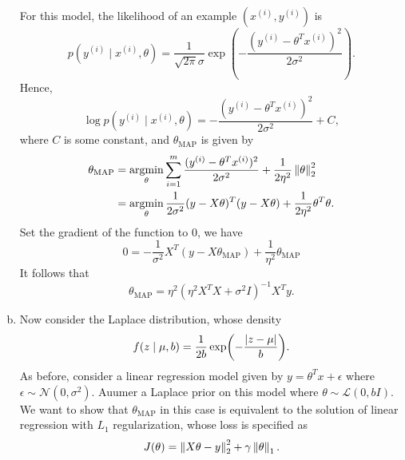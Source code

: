\documentclass[12pt,letterpaper,boxed]{hmcpset}
\newcommand{\yy}{y^{(i)}}
\newcommand{\xx}{x^{(i)}}
\DeclareMathOperator*{\argmin}{argmin}
\newcommand{\thetamap}{\theta_{\mathrm{MAP}}}
\begin{document}
\begin{solution}
\begin{enumerate}[(a)]
    For this model, the likelihood of an example $(\xx, \yy)$ is
    \[
    p(\yy \mid \xx, \theta) = \frac{1}{\sqrt{2\pi} \sigma} \exp(-\frac{(\yy - \theta^T \xx)^2}{2\sigma^2}).
    \]
    Hence,
    \[
    \log p(\yy \mid \xx, \theta) = - \frac{(\yy - \theta^T \xx)^2}{2\sigma^2} + C,
    \]
    where $C$ is some constant, and $\theta_{\mathrm{MAP}}$ is given by
    \[
    \begin{aligned}
      \theta_{\mathrm{MAP}} &= \argmin_\theta \sum_{i=1}^m \frac{(\yy - \theta^T \xx)^2}{2\sigma^2} + \frac{1}{2\eta^2} \norm{\theta}_2^2 \\
      &= \argmin_\theta \frac{1}{2\sigma^2} (y - X\theta)^T (y - X\theta) + \frac{1}{2\eta^2} \theta^T \theta.
    \end{aligned}
    \]
    Set the gradient of the function to 0, we have
    \[
    0 = -\frac{1}{\sigma^2} X^T(y-X\thetamap) + \frac{1}{\eta^2} \thetamap
    \]
    It follows that
    \[
    \thetamap = \eta^2 (\eta^2 X^T X + \sigma^2 I)^{-1} X^T y.
    \]
    
    \item Now consider the Laplace distribution, whose density 
    \[
    f(z \mid \mu, b) = \frac{1}{2b} \exp(-\frac{\left\lvert z-\mu\right\rvert}{b}).
    \]
    As before, consider a linear regression model given by $y = \theta^T x + \epsilon$ where $\epsilon \sim \mathcal{N}(0, \sigma^2)$. Auumer a Laplace prior on this model where $\theta \sim \mathcal{L} (0, bI)$. We want to show that $\thetamap$ in this case is equivalent to the solution of linear regression with $L_1$ regularization, whose loss is specified as
    \[
    J(\theta) = \left\lVert X\theta - y\right\rVert_2^2 + \gamma \left\lVert \theta\right\rVert_1.
    \]
    
  \end{enumerate}
\end{solution}
\end{document}
